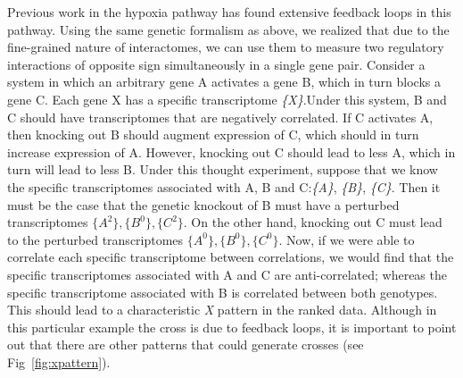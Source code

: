 \documentclass[9pt,twocolumn,twoside]{pnas-new}
\begin{document}
Previous work in the hypoxia pathway has found extensive feedback loops in this pathway. Using the same genetic formalism as above, we realized that due to the fine-grained nature of interactomes, we can use them to measure two regulatory interactions of opposite sign simultaneously in a single gene pair. Consider a system in which an arbitrary gene A activates a gene B, which in turn blocks a gene C. Each gene X has a specific transcriptome \emph{\{X\}}.Under this system, B and C should have transcriptomes that are negatively correlated. If C activates A, then knocking out B should augment expression of C, which should in turn increase expression of A.
However, knocking out C should lead to less A, which in turn will lead to less B. Under this thought experiment, suppose that we know the specific transcriptomes associated with A, B and C:\@\emph{\{A\}}, \emph{\{B\}}, \emph{\{C\}}. Then it must be the case that the genetic knockout of B must have a perturbed transcriptomes $\{A^2\}, \{B^0\}, \{C^2\}$. On the other hand, knocking out C must lead to the perturbed transcriptomes $\{A^0\}, \{B^0\}, \{C^0\}$.
Now, if we were able to correlate each specific transcriptome between correlations, we would find that the specific transcriptomes associated with A and C are anti-correlated; whereas the specific transcriptome associated with B is correlated between both genotypes. This should lead to a characteristic \emph{X} pattern in the ranked data. Although in this particular example the cross is due to feedback loops, it is important to point out that there are other patterns that could generate crosses (see Fig~\ref{fig:xpattern}).
\end{document}
